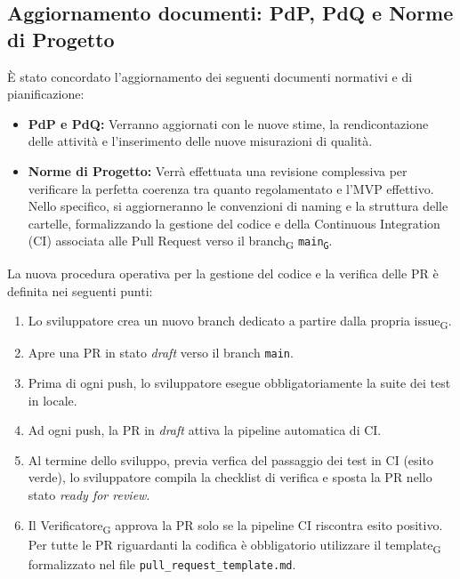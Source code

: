 \subsection{Aggiornamento documenti: PdP, PdQ e Norme di Progetto}

È stato concordato l'aggiornamento dei seguenti documenti normativi e di pianificazione:
\begin{itemize}

\item \textbf{PdP e PdQ:} Verranno aggiornati con le nuove stime, la rendicontazione delle attività e l'inserimento delle nuove misurazioni di qualità.

\item \textbf{Norme di Progetto:} Verrà effettuata una revisione complessiva per verificare la perfetta coerenza tra quanto regolamentato e l'MVP effettivo. Nello specifico, si aggiorneranno le convenzioni di naming e la struttura delle cartelle, formalizzando la gestione del codice e della Continuous Integration (CI) associata alle Pull Request verso il branch\textsubscript{G} \texttt{main\textsubscript{G}}.

\end{itemize}

La nuova procedura operativa per la gestione del codice e la verifica delle PR è definita nei seguenti punti:
\begin{enumerate}

\item Lo sviluppatore crea un nuovo branch dedicato a partire dalla propria issue\textsubscript{G}.

\item Apre una PR in stato \textit{draft} verso il branch \texttt{main}.

\item Prima di ogni push, lo sviluppatore esegue obbligatoriamente la suite dei test in locale.

\item Ad ogni push, la PR in \textit{draft} attiva la pipeline automatica di CI.

\item Al termine dello sviluppo, previa verfica del passaggio dei test in CI (esito verde), lo sviluppatore compila la checklist di verifica e sposta la PR nello stato \textit{ready for review}.

\item Il Verificatore\textsubscript{G} approva la PR solo se la pipeline CI riscontra esito positivo. Per tutte le PR riguardanti la codifica è obbligatorio utilizzare il template\textsubscript{G} formalizzato nel file \texttt{pull\_request\_template.md}.

\end{enumerate}


